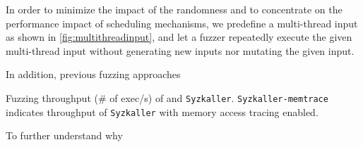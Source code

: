 In order to minimize the impact of the randomness and to concentrate
on the performance impact of scheduling mechanisms, we predefine a
multi-thread input as shown in \autoref{fig:multithreadinput}, and let
a fuzzer repeatedly execute the given multi-thread input without
generating new inputs nor mutating the given input.

In addition, previous fuzzing approaches


%
\begin{table}[t]
  \small
  \centering
  
  \caption{Fuzzing throughput (\# of exec/s) of \sys and
    \texttt{Syzkaller}. \texttt{Syzkaller-memtrace} indicates
    throughput of \texttt{Syzkaller} with memory access tracing
    enabled.}
  \label{table:throughput}
\end{table}
%




%
To further understand why 






